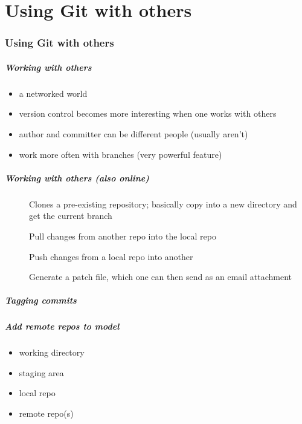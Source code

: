 \part{Using Git with others}

\section{Using Git with others}

\begin{frame}
\frametitle{Working with others}
\begin{itemize}
    \item a networked world
    \item version control becomes more interesting when one works with
        others
    \item author and committer can be different people (usually aren't)
    \item work more often with branches (very powerful feature)
\end{itemize}
\end{frame}

\begin{frame}
\frametitle{Working with others (also online)}

\begin{description}
    \item[] Clones a pre-existing repository; basically copy
        into a new directory and get the current branch
    \item[] Pull changes from another repo into the local repo
    \item[] Push changes from a local repo into another
    \item[] Generate a patch file, which one can
        then send as an email attachment
\end{description}
\end{frame}

\begin{frame}
\frametitle{Tagging commits}
\end{frame}

\begin{frame}
\frametitle{Add remote repos to model}
\begin{itemize}
    \item working directory
    \item staging area
    \item local repo
    \item remote repo(s)
\end{itemize}
\end{frame}

